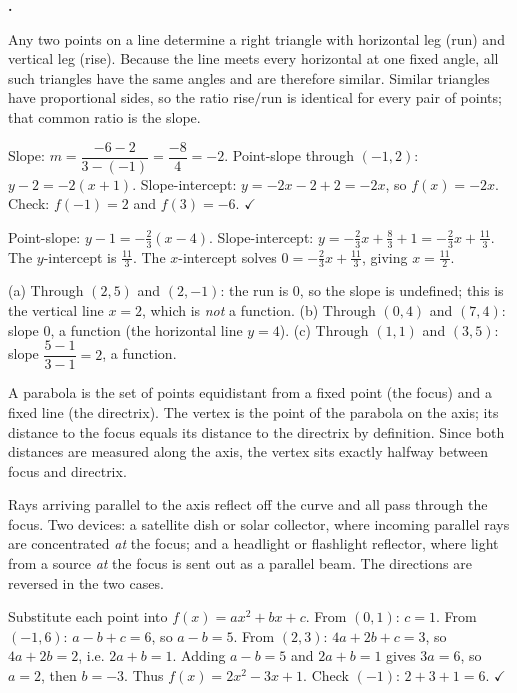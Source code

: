 \documentclass[12pt]{book}
\let\originalcheckmark\checkmark
\renewcommand{\checkmark}{\ensuremath{\originalcheckmark}}
\newcounter{soln}[section]
\newenvironment{solutions}{%
  \setcounter{soln}{0}%
  \begin{list}{\textbf{\arabic{soln}.}}{%
    \usecounter{soln}\setlength{\leftmargin}{2.2em}\setlength{\itemsep}{10pt}}%
}{\end{list}}
\begin{document}
\begin{solutions}
\item Any two points on a line determine a right triangle with horizontal leg (run)
and vertical leg (rise). Because the line meets every horizontal at one fixed angle,
all such triangles have the same angles and are therefore similar. Similar triangles
have proportional sides, so the ratio rise$/$run is identical for every pair of
points; that common ratio is the slope.

\item Slope: $m=\dfrac{-6-2}{3-(-1)}=\dfrac{-8}{4}=-2$. Point-slope through $(-1,2)$:
$y-2=-2(x+1)$. Slope-intercept: $y=-2x-2+2=-2x$, so $f(x)=-2x$. Check: $f(-1)=2$ and
$f(3)=-6$. \checkmark

\item Point-slope: $y-1=-\tfrac23(x-4)$. Slope-intercept:
$y=-\tfrac23 x+\tfrac83+1=-\tfrac23 x+\tfrac{11}{3}$. The $y$-intercept is
$\tfrac{11}{3}$. The $x$-intercept solves $0=-\tfrac23 x+\tfrac{11}{3}$, giving
$x=\tfrac{11}{2}$.

\item (a) Through $(2,5)$ and $(2,-1)$: the run is $0$, so the slope is undefined; this
is the vertical line $x=2$, which is \emph{not} a function. (b) Through $(0,4)$ and
$(7,4)$: slope $0$, a function (the horizontal line $y=4$). (c) Through $(1,1)$ and
$(3,5)$: slope $\dfrac{5-1}{3-1}=2$, a function.

\item A parabola is the set of points equidistant from a fixed point (the focus) and a
fixed line (the directrix). The vertex is the point of the parabola on the axis; its
distance to the focus equals its distance to the directrix by definition. Since both
distances are measured along the axis, the vertex sits exactly halfway between focus
and directrix.

\item Rays arriving parallel to the axis reflect off the curve and all pass through the
focus. Two devices: a satellite dish or solar collector, where incoming parallel rays
are concentrated \emph{at} the focus; and a headlight or flashlight reflector, where
light from a source \emph{at} the focus is sent out as a parallel beam. The directions
are reversed in the two cases.

\item Substitute each point into $f(x)=ax^2+bx+c$. From $(0,1)$: $c=1$. From
$(-1,6)$: $a-b+c=6$, so $a-b=5$. From $(2,3)$: $4a+2b+c=3$, so $4a+2b=2$, i.e.
$2a+b=1$. Adding $a-b=5$ and $2a+b=1$ gives $3a=6$, so $a=2$, then $b=-3$. Thus
$f(x)=2x^2-3x+1$. Check $(-1)$: $2+3+1=6$. \checkmark


\end{solutions}
\end{document}
